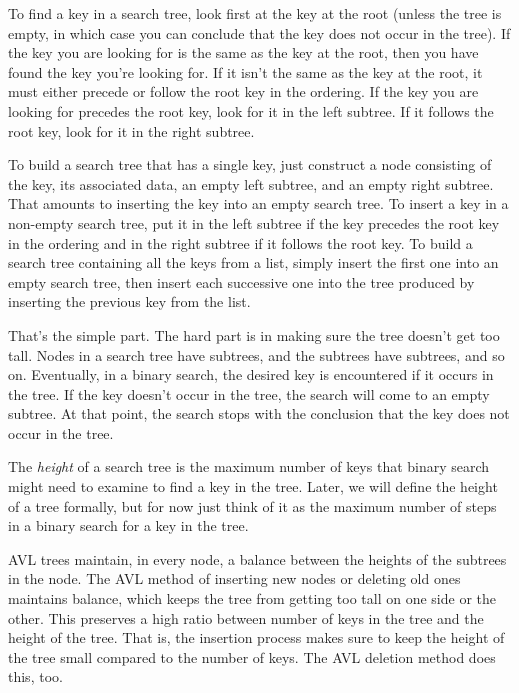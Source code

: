 \label{binary-search-def}
To find a key in a search tree,
look first at the key at the root (unless the tree is empty,
in which case
you can conclude that the key does not occur in the tree).
If the key you are looking for is the same as the key at the root,
then you have found the key you're looking for.
If it isn't the same as the key at the root,
it must either precede or follow the root key in the ordering.
If the key you are looking for precedes the root key,
look for it in the left subtree.
If it follows the root key, look for it in the right subtree.

To build a search tree that has a single key,
just construct a node consisting of the key,
its associated data,
an empty left subtree,
and an empty right subtree.
That amounts to inserting the key into an empty search tree.
To insert a key in a non-empty search tree, put it in the left subtree
if the key precedes the root key in the ordering and
in the right subtree if it follows the root key.
\label{insertion-def}
To build a search tree containing
all the keys from a list, simply insert the first one into an empty
search tree, then insert each successive one into the tree
produced by inserting the previous key from the list.

That's the simple part.
The hard part is in making sure the tree
doesn't get too tall.
Nodes in a search tree have subtrees,
and the subtrees have subtrees, and so on.
Eventually, in a binary search,
the desired key is encountered if it occurs in the tree.
If the key doesn't occur in the tree, the search will come to
an empty subtree.
At that point, the search stops with the conclusion that the key
does not occur in the tree.

The
\label{height-is-max-steps}\emph{height}
of a search tree is the maximum number of keys
that binary search might need
to examine to find a key in the tree.
Later, we will define the height of a tree formally,
but for now just think of it as the maximum number of steps
in a binary search for a key in the tree.

AVL trees maintain, in every node,
a balance between the heights of the subtrees in the node.
The AVL method of inserting new nodes or deleting old ones
maintains balance,
which keeps the tree from getting too tall
on one side or the other.
This preserves a high ratio between number of keys
in the tree and the height of the tree.
That is, the insertion process makes sure
to keep the height of the tree small
compared to the number of keys.
The AVL deletion method does this, too.

